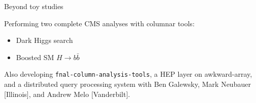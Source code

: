 \documentclass[aspectratio=169]{beamer}
\begin{document}
\begin{frame}{Beyond toy studies}
\begin{center}
\begin{minipage}{0.8\linewidth}
\large Performing two complete CMS analyses with columnar tools:
\begin{itemize}
\item Dark Higgs search
\item Boosted SM $H \to b\bar{b}$
\end{itemize}
\end{minipage}
\end{center}

\vspace{0.25 cm}
Also developing {\tt fnal-column-analysis-tools}, a HEP layer on awkward-array,
and a distributed query processing system with Ben Galewsky, Mark Neubauer [Illinois], and Andrew Melo [Vanderbilt].
\end{frame}
\end{document}

